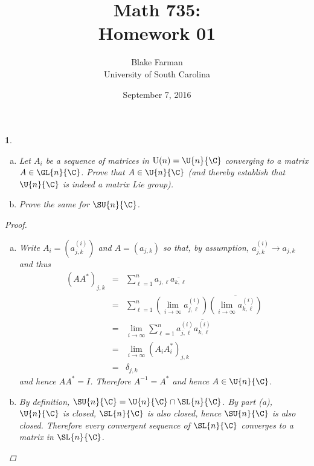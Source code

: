 \documentclass[10pt]{amsart}
\author{Blake Farman\\University of South Carolina}
\title{Math 735:\\Homework 01}
\date{September 7, 2016}
\begin{document}
\maketitle

\providecommand{\p}{\mathfrak{p}}
\providecommand{\m}{\mathfrak{m}}
\providecommand{\Deck}[1]{\operatorname{Deck}\left(#1\right)}
\newtheorem{thm}{Theorem}
\newtheorem{ex}{}
\newtheorem{lem}{Lemma}
\newtheorem{cor}{Corollary}
\newtheorem{prop}{Proposition}
\theoremstyle{definition}
\newtheorem{defn}{Definition}

\newcommand{\A}{\mathbb{A}}

\begin{ex}\label{thm1}
  \begin{enumerate}[(a)]
  \item
    Let $A_i$ be a sequence of matrices in $\operatorname{U}(n) = \U{n}{\C}$ converging to a matrix $A \in \GL{n}{\C}$.
    Prove that $A \in \U{n}{\C}$ (and thereby establish that $\U{n}{\C}$ is indeed a matrix Lie group).
  \item
    Prove the same for $\SU{n}{\C}$.
  \end{enumerate}
  \begin{proof}
    \begin{enumerate}[(a)]
    \item
      Write $A_i = \left(a_{j,k}^{(i)}\right)$ and $A = \left(a_{j,k}\right)$ so that, by assumption, $a_{j,k}^{(i)} \rightarrow a_{j,k}$ and thus
      \begin{eqnarray*}
        (AA^*)_{j,k} &=& \sum_{\ell = 1}^n a_{j,\ell}\overline{a_{k,\ell}}\\
        &=& \sum_{\ell = 1}^n \left(\lim_{i \rightarrow \infty}a_{j,\ell}^{(i)}\right)\overline{\left(\lim_{i \rightarrow \infty}a_{k,\ell}^{(i)}\right)}\\
        &=& \lim_{i \rightarrow \infty}\sum_{\ell = 1}^n a_{j,\ell}^{(i)}\overline{a_{k,\ell}^{(i)}}\\
        &=& \lim_{i \rightarrow \infty} (A_iA_i^*)_{j,k}\\
        &=& \delta_{j,k}
      \end{eqnarray*}
      and hence $AA^* = I$.
      Therefore $A^{-1} = A^*$ and hence $A \in \U{n}{\C}$.
    \item
      By definition, $\SU{n}{\C} = \U{n}{\C} \cap \SL{n}{\C}$.
      By part (a), $\U{n}{\C}$ is closed, $\SL{n}{\C}$ is also closed, hence $\SU{n}{\C}$ is also closed.
      Therefore every convergent sequence of $\SL{n}{\C}$ converges to a matrix in $\SL{n}{\C}$.
    \end{enumerate}
  \end{proof}
\end{ex}
\end{document}
